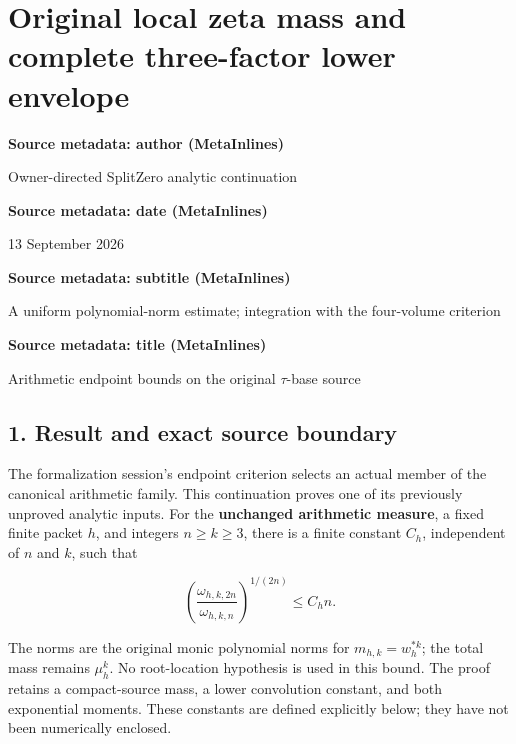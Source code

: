 \endgroup

\clearpage
\begingroup


\setcounter{equation}{0}
\renewcommand{\theequation}{ZLM.\arabic{equation}}
\section*{Original local zeta mass and complete three-factor lower envelope}
\textbf{Source metadata: author (MetaInlines)}

Owner-directed SplitZero analytic continuation

\textbf{Source metadata: date (MetaInlines)}

13 September 2026

\textbf{Source metadata: subtitle (MetaInlines)}

A uniform polynomial-norm estimate; integration with the four-volume criterion

\textbf{Source metadata: title (MetaInlines)}

Arithmetic endpoint bounds on the original \(\tau\)-base source

\subsection{1. Result and exact source boundary}\label{zlm:endpoint-arithmetic_original--result-and-exact-source-boundary}

The formalization session's endpoint criterion selects an actual member of the canonical arithmetic family. This continuation proves one of its previously unproved analytic inputs. For the \textbf{unchanged arithmetic measure}, a fixed finite packet \(h\), and integers \(n\ge k\ge3\), there is a finite constant \(C_h\), independent of \(n\) and \(k\), such that

\[
 \boxed{\left(\frac{\omega_{h,k,2n}}{\omega_{h,k,n}}\right)^{1/(2n)}
       \le C_h n.}                                                    \tag{1}
\]

The norms are the original monic polynomial norms for \(m_{h,k}=w_h^{*k}\); the total mass remains \(\mu_h^k\). No root-location hypothesis is used in this bound. The proof retains a compact-source mass, a lower convolution constant, and both exponential moments. These constants are defined explicitly below; they have not been numerically enclosed.


